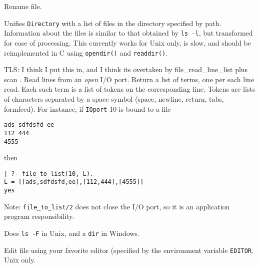 {
Rename file.


Unifies {\tt Directory} with a list of files in the directory specified by
path.  Information about the files is similar to that obtained by {\tt ls
  -l}, but transformed for ease of processing.  This currently works for
Unix only, is slow, and should be reimplemented in C using {\tt opendir()}
and {\tt readdir()}.

TLS: I think I put this in, and I think its overtaken by
file_read_line_list plus scan . 
Read lines from an \emph{open} I/O port. Return a
list of terms, one per each line read. Each such term is a list of tokens
on the corresponding line.  Tokens are lists of characters separated by a
space symbol (space, newline, return, tabs, formfeed). For instance, if
{\tt IOport} 10 is bound to a file
\begin{verbatim}
ads sdfdsfd ee
112 444
4555  
\end{verbatim}
then
\begin{verbatim}
| ?- file_to_list(10, L).  
L = [[ads,sdfdsfd,ee],[112,444],[4555]]
yes
\end{verbatim}
Note: {\tt file\_to\_list/2} does not close the I/O port, so it is an
application program responsibility.



Does {\tt ls -F} in Unix, and a {\tt dir} in Windows.

Edit file using your favorite editor (specified by the environment variable
{\tt EDITOR}. Unix only.
}

